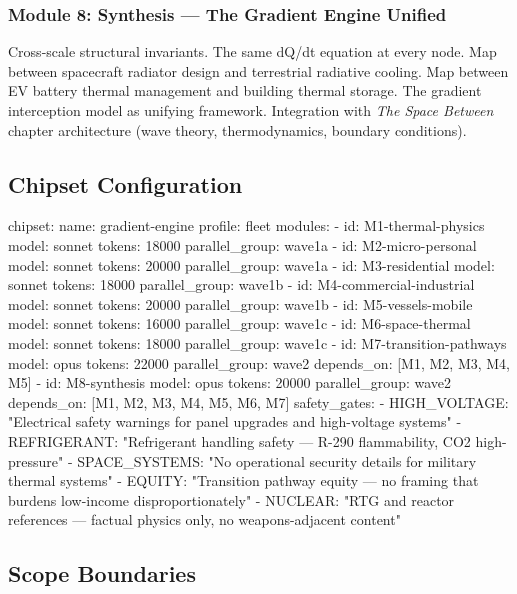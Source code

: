 \documentclass[11pt,letterpaper]{article}
\begin{document}
\subsubsection{Module 8: Synthesis --- The Gradient Engine Unified}
Cross-scale structural invariants. The same dQ/dt equation at every node. Map between spacecraft radiator design and terrestrial radiative cooling. Map between EV battery thermal management and building thermal storage. The gradient interception model as unifying framework. Integration with \textit{The Space Between} chapter architecture (wave theory, thermodynamics, boundary conditions).

\subsection{Chipset Configuration}

\begin{asciibox}
chipset:
  name: gradient-engine
  profile: fleet
  modules:
    - id: M1-thermal-physics
      model: sonnet
      tokens: 18000
      parallel_group: wave1a
    - id: M2-micro-personal
      model: sonnet
      tokens: 20000
      parallel_group: wave1a
    - id: M3-residential
      model: sonnet
      tokens: 18000
      parallel_group: wave1b
    - id: M4-commercial-industrial
      model: sonnet
      tokens: 20000
      parallel_group: wave1b
    - id: M5-vessels-mobile
      model: sonnet
      tokens: 16000
      parallel_group: wave1c
    - id: M6-space-thermal
      model: sonnet
      tokens: 18000
      parallel_group: wave1c
    - id: M7-transition-pathways
      model: opus
      tokens: 22000
      parallel_group: wave2
      depends_on: [M1, M2, M3, M4, M5]
    - id: M8-synthesis
      model: opus
      tokens: 20000
      parallel_group: wave2
      depends_on: [M1, M2, M3, M4, M5, M6, M7]
  safety_gates:
    - HIGH_VOLTAGE: "Electrical safety warnings for panel upgrades and high-voltage systems"
    - REFRIGERANT: "Refrigerant handling safety — R-290 flammability, CO2 high-pressure"
    - SPACE_SYSTEMS: "No operational security details for military thermal systems"
    - EQUITY: "Transition pathway equity — no framing that burdens low-income disproportionately"
    - NUCLEAR: "RTG and reactor references — factual physics only, no weapons-adjacent content"
\end{asciibox}

\subsection{Scope Boundaries}
\end{document}
